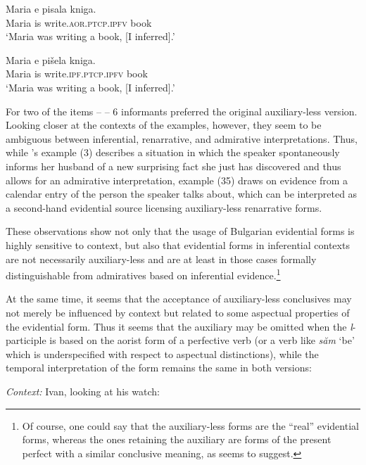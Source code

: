\documentclass[output=paper,
colorlinks,
citecolor=brown,
newtxmath
]{langscibook}
\begin{document}
\ea \label{smirnova:infer-acceptability:alternative1}
\gll Maria e pisala kniga. \\
Maria is write.\textsc{aor.ptcp.ipfv} book\\
\glt `Maria was writing a book, [I inferred].'
\z

\ea \label{smirnova:infer-acceptability:alternative2}
\gll Maria e pišela kniga. \\
Maria is write.\textsc{ipf.ptcp.ipfv} book\\
\glt ‘Maria was writing a book, [I inferred].’
\z

\noindent For two of the items -- \citet[480, (3) and 498, (35)]{Smirnova2013} -- 6 informants preferred the original auxiliary-less version. Looking closer at the contexts of the examples, however, they seem to be ambiguous between inferential, renarrative, and admirative interpretations. Thus, while \citeauthor{Smirnova2013}'s example (3) describes a situation in which the speaker spontaneously informs her husband of a new surprising fact she just has discovered and thus allows for an admirative interpretation, example (35) draws on evidence from a calendar entry of the person the speaker talks about, which can be interpreted as a second-hand evidential source licensing auxiliary-less renarrative forms.

These observations show not only that the usage of Bulgarian evidential forms is highly sensitive to context, but also that evidential forms in inferential contexts are not necessarily auxiliary-less and are at least in those cases formally distinguishable from admiratives based on inferential evidence.\footnote{Of course, one could say that the auxiliary-less forms are the ``real'' evidential forms, whereas the ones retaining the auxiliary are forms of the present perfect with a similar conclusive meaning, as \citet{Izvorski1997} seems to suggest.}

At the same time, it seems that the acceptance of auxiliary-less conclusives may not merely be influenced by context but related to some aspectual properties of the evidential form. Thus it seems that the auxiliary may be omitted when the \textit{l}-participle is based on the aorist form of a perfective verb (or a verb like \textit{săm} `be' which is underspecified with respect to aspectual distinctions), while the temporal interpretation of the form remains the same in both versions:

\eanoraggedright\label{stanalo}
\textit{Context:} Ivan, looking at his watch:\vspace{-6pt}
\z
\begin{exe}
\end{exe}
\end{document}
